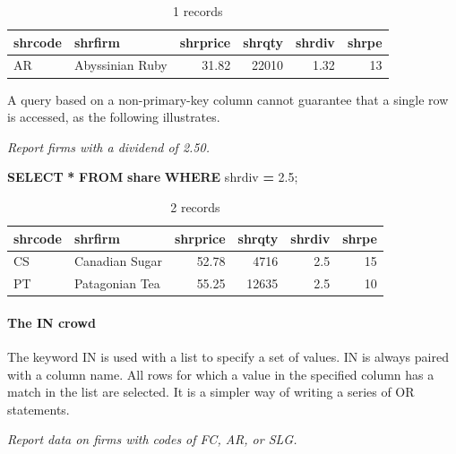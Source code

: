 \documentclass[
]{article}
\newenvironment{Shaded}{\begin{snugshade}}{\end{snugshade}}
\newcommand{\FloatTok}[1]{\textcolor[rgb]{0.00,0.00,0.81}{#1}}
\newcommand{\KeywordTok}[1]{\textcolor[rgb]{0.13,0.29,0.53}{\textbf{#1}}}
\newcommand{\NormalTok}[1]{#1}
\newcommand{\OperatorTok}[1]{\textcolor[rgb]{0.81,0.36,0.00}{\textbf{#1}}}
\begin{document}
\begin{table}

\caption{\label{tab:unnamed-chunk-11}1 records}
\centering
\begin{tabular}[t]{l|l|r|r|r|r}
\hline
shrcode & shrfirm & shrprice & shrqty & shrdiv & shrpe\\
\hline
AR & Abyssinian Ruby & 31.82 & 22010 & 1.32 & 13\\
\hline
\end{tabular}
\end{table}

A query based on a non-primary-key column cannot guarantee that a single row is accessed, as the following illustrates.

\emph{Report firms with a dividend of 2.50.}

\begin{Shaded}
\begin{Highlighting}[]
\KeywordTok{SELECT} \OperatorTok{*} \KeywordTok{FROM} \KeywordTok{share} \KeywordTok{WHERE}\NormalTok{ shrdiv }\OperatorTok{=} \FloatTok{2.5}\NormalTok{;}
\end{Highlighting}
\end{Shaded}

\begin{table}

\caption{\label{tab:unnamed-chunk-12}2 records}
\centering
\begin{tabular}[t]{l|l|r|r|r|r}
\hline
shrcode & shrfirm & shrprice & shrqty & shrdiv & shrpe\\
\hline
CS & Canadian Sugar & 52.78 & 4716 & 2.5 & 15\\
\hline
PT & Patagonian Tea & 55.25 & 12635 & 2.5 & 10\\
\hline
\end{tabular}
\end{table}

\hypertarget{the-in-crowd}{%
\paragraph*{The IN crowd}\label{the-in-crowd}}

The keyword IN is used with a list to specify a set of values. IN is always paired with a column name. All rows for which a value in the specified column has a match in the list are selected. It is a simpler way of writing a series of OR statements.

\emph{Report data on firms with codes of FC, AR, or SLG.}
\end{document}
